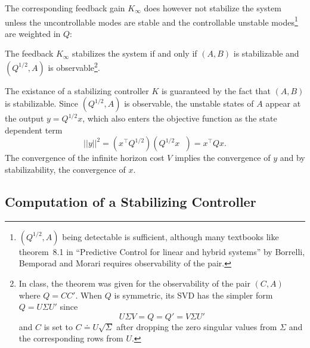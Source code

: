 The corresponding feedback gain $K_\infty$ does however not stabilize the system unless the uncontrollable modes are stable and the controllable unstable modes\footnote{$(Q^{1/2},A)$ being detectable is sufficient, although many textbooks like theorem~8.1 in ``Predictive Control for linear and hybrid systems'' by Borrelli, Bemporad and Morari requires observability of the pair.} are weighted in $Q$:
\begin{theorem}
  The feedback $K_\infty$ stabilizes the system if and only if $(A,B)$ is stabilizable and $(Q^{1/2},A)$ is observable\footnote{In class, the theorem was given for the observability of the pair $(C,A)$ where $Q=CC'$. When $Q$ is symmetric, its SVD has the simpler form $Q = U\Sigma U'$ since
    \begin{equation*}
      U\Sigma V = Q = Q' = V\Sigma U'
    \end{equation*}
    and $C$ is set to $C \doteq U\sqrt{\Sigma}$ after dropping the zero singular values from $\Sigma$ and the corresponding rows from $U$.}.
\end{theorem}
The existance of a stabilizing controller $K$ is guaranteed by the fact that $(A,B)$ is stabilizable. Since $(Q^{1/2},A)$ is observable, the unstable states of $A$ appear at the output $y=Q^{1/2}x$, which also enters the objective function as the state dependent term
\begin{equation*}
  ||y||^2 = \left(x^\top Q^{1/2}\right)\left(Q^{1/2} x^{\phantom{\top}}\right) = x^\top Qx.
\end{equation*}
The convergence of the infinite horizon cost $V$ implies the convergence of $y$ and by stabilizability, the convergence of $x$.


\subsection{Computation of a Stabilizing Controller}
\label{sec:stability-optimal-controller}

